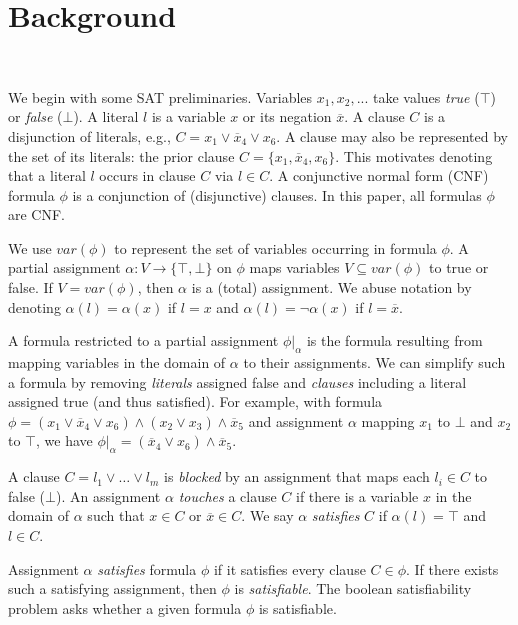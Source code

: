 \section{Background}~\label{sec:background}

We begin with some SAT preliminaries. Variables $x_1, x_2, ...$ take values
\emph{true} ($\top$) or \emph{false} ($\bot$). A literal $l$ is a variable
$x$ or its negation $\overline{x}$. A clause $C$ is a disjunction of literals,
e.g., $C = x_1 \lor \overline{x}_4 \lor x_6$. A clause may also be represented by the set of its literals:
the prior clause $C = \{x_1, \overline{x}_4, x_6\}$. This motivates denoting that a literal
$l$ occurs in clause $C$ via $l \in C$. A conjunctive normal form (CNF)
formula $\phi$ is a conjunction of (disjunctive) clauses. In this paper,
all formulas $\phi$ are CNF.

We use $var(\phi)$ to represent the set of variables occurring in formula $\phi$.
A partial assignment $\alpha : V \rightarrow \{\top, \bot\}$ on $\phi$
maps variables $V \subseteq var(\phi)$ to true or false. If $V
= var(\phi)$, then $\alpha$ is a (total) assignment. We abuse notation by
denoting $\alpha(l) = \alpha(x)$ if $l = x$ and $\alpha(l) = \neg \alpha(x)$ if
$l = \overline{x}$.

A formula restricted to a partial assignment $\phi|_\alpha$ is the formula resulting from
mapping variables in the domain of $\alpha$ to their assignments. We can
simplify such a formula by removing \emph{literals} assigned false and
\emph{clauses} including a literal assigned true (and thus satisfied).
For example, with formula $\phi =
(x_1 \lor \overline{x}_4 \lor x_6) \land (x_2 \lor x_3) \land \overline{x}_5$
and assignment $\alpha$ mapping $x_1$ to $\bot$ and $x_2$ to $\top$,
we have $\phi|_\alpha = (\overline{x}_4 \lor x_6) \land \overline{x}_5$.

A clause $C = l_1 \lor \dots \lor l_m$ is \emph{blocked} by an assignment
that maps each $l_i \in C$ to false ($\bot$). An assignment $\alpha$
\emph{touches} a clause $C$ if there is a variable $x$ in the domain of $\alpha$
such that $x \in C$ or $\overline{x} \in C$. We say $\alpha$ \emph{satisfies}
$C$ if $\alpha(l) = \top$ and $l \in C$.

Assignment $\alpha$ \emph{satisfies} formula $\phi$ if it satisfies every
clause $C \in \phi$. If there exists such a satisfying assignment, then $\phi$ is
\emph{satisfiable}. The boolean satisfiability problem asks whether a given
formula $\phi$ is satisfiable.

